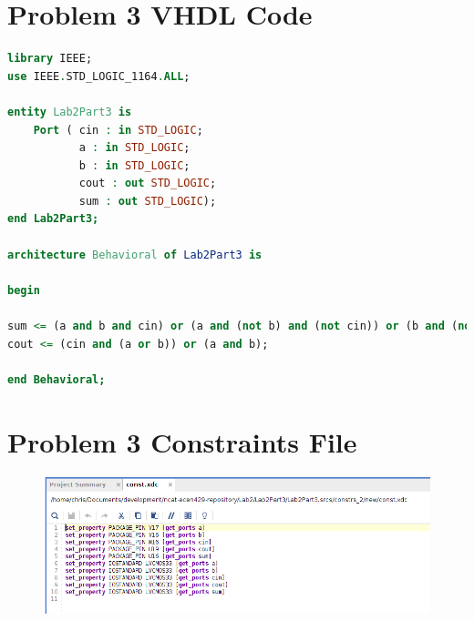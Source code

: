\documentclass[11pt]{article}
\begin{document}
\begin{appendices}
	\section{Problem 3 VHDL Code}
	
	\begin{lstlisting}[language=VHDL]
library IEEE;
use IEEE.STD_LOGIC_1164.ALL;

entity Lab2Part3 is
    Port ( cin : in STD_LOGIC;
           a : in STD_LOGIC;
           b : in STD_LOGIC;
           cout : out STD_LOGIC;
           sum : out STD_LOGIC);
end Lab2Part3;

architecture Behavioral of Lab2Part3 is

begin

sum <= (a and b and cin) or (a and (not b) and (not cin)) or (b and (not a) and (not cin)) or (cin and (not a) and (not b));
cout <= (cin and (a or b)) or (a and b);

end Behavioral;
	\end{lstlisting}
	
	\section{Problem 3 Constraints File}
	
	\begin{figure}[h]
	\includegraphics[width=\textwidth]{report-images/img7}
	\end{figure}
	
\end{appendices}
\end{document}
